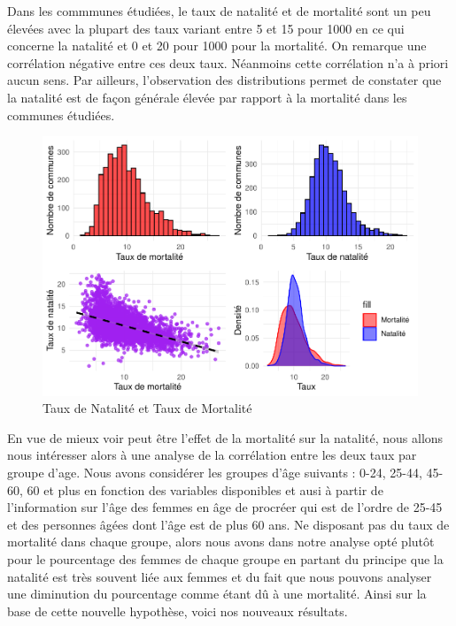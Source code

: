 \documentclass[
]{article}
\begin{document}
Dans les commmunes étudiées, le taux de natalité et de mortalité sont un
peu élevées avec la plupart des taux variant entre 5 et 15 pour 1000 en
ce qui concerne la natalité et 0 et 20 pour 1000 pour la mortalité. On
remarque une corrélation négative entre ces deux taux. Néanmoins cette
corrélation n'a à priori aucun sens. Par ailleurs, l'observation des
distributions permet de constater que la natalité est de façon générale
élevée par rapport à la mortalité dans les communes étudiées.

\begin{figure}

{\centering \includegraphics{4_Analyse_Descriptive_files/figure-latex/unnamed-chunk-4-1} 

}

\caption{Taux de Natalité et Taux de Mortalité}\label{fig:unnamed-chunk-4}
\end{figure}

En vue de mieux voir peut être l'effet de la mortalité sur la natalité,
nous allons nous intéresser alors à une analyse de la corrélation entre
les deux taux par groupe d'age. Nous avons considérer les groupes d'âge
suivants : 0-24, 25-44, 45-60, 60 et plus en fonction des variables
disponibles et ausi à partir de l'information sur l'âge des femmes en
âge de procréer qui est de l'ordre de 25-45 et des personnes âgées dont
l'âge est de plus 60 ans. Ne disposant pas du taux de mortalité dans
chaque groupe, alors nous avons dans notre analyse opté plutôt pour le
pourcentage des femmes de chaque groupe en partant du principe que la
natalité est très souvent liée aux femmes et du fait que nous pouvons
analyser une diminution du pourcentage comme étant dû à une mortalité.
Ainsi sur la base de cette nouvelle hypothèse, voici nos nouveaux
résultats.
\end{document}
